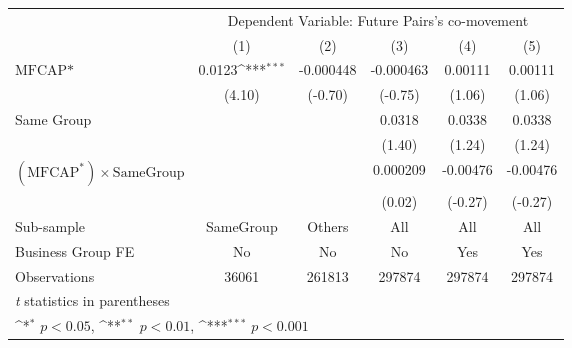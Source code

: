 {
\def\sym#1{\ifmmode^{#1}\else\(^{#1}\)\fi}
\begin{tabular}{l*{5}{c}}
\hline\hline
                &\multicolumn{5}{c}{Dependent Variable:  Future Pairs's co-movement}                           \\\cmidrule(lr){2-6}
                &\multicolumn{1}{c}{(1)}         &\multicolumn{1}{c}{(2)}         &\multicolumn{1}{c}{(3)}         &\multicolumn{1}{c}{(4)}         &\multicolumn{1}{c}{(5)}         \\
\hline
$ \text{MFCAP*} $&   0.0123\sym{***}&-0.000448         &-0.000463         &  0.00111         &  0.00111         \\
                &   (4.10)         &  (-0.70)         &  (-0.75)         &   (1.06)         &   (1.06)         \\
[1em]
Same Group      &                  &                  &   0.0318         &   0.0338         &   0.0338         \\
                &                  &                  &   (1.40)         &   (1.24)         &   (1.24)         \\
[1em]
 $ (\text{MFCAP}^*) \times {\text{SameGroup} }  $ &                  &                  & 0.000209         & -0.00476         & -0.00476         \\
                &                  &                  &   (0.02)         &  (-0.27)         &  (-0.27)         \\
\hline
Sub-sample      &SameGroup         &   Others         &      All         &      All         &      All         \\
Business Group FE&       No         &       No         &       No         &      Yes         &      Yes         \\
Observations    &    36061         &   261813         &   297874         &   297874         &   297874         \\
\hline\hline
\multicolumn{6}{l}{\footnotesize \textit{t} statistics in parentheses}\\
\multicolumn{6}{l}{\footnotesize \sym{*} \(p<0.05\), \sym{**} \(p<0.01\), \sym{***} \(p<0.001\)}\\
\end{tabular}
}

